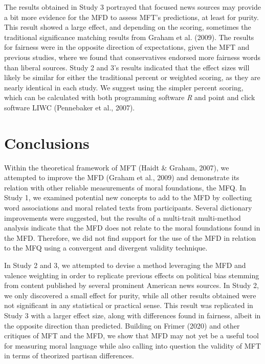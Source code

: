 \documentclass[
  man,floatsintext]{apa6}
\begin{document}
The results obtained in Study 3 portrayed that focused news sources may provide a bit more evidence for the MFD to assess MFT's predictions, at least for purity. This result showed a large effect, and depending on the scoring, sometimes the traditional significance matching results from Graham et al. (2009). The results for fairness were in the opposite direction of expectations, given the MFT and previous studies, where we found that conservatives endorsed more fairness words than liberal sources. Study 2 and 3's results indicated that the effect sizes will likely be similar for either the traditional percent or weighted scoring, as they are nearly identical in each study. We suggest using the simpler percent scoring, which can be calculated with both programming software \emph{R} and point and click software LIWC (Pennebaker et al., 2007).

\section{Conclusions}\label{conclusions}

Within the theoretical framework of MFT (Haidt \& Graham, 2007), we attempted to improve the MFD (Graham et al., 2009) and demonstrate its relation with other reliable measurements of moral foundations, the MFQ. In Study 1, we examined potential new concepts to add to the MFD by collecting word associations and moral related texts from participants. Several dictionary improvements were suggested, but the results of a multi-trait multi-method analysis indicate that the MFD does not relate to the moral foundations found in the MFD. Therefore, we did not find support for the use of the MFD in relation to the MFQ using a convergent and divergent validity technique.

In Study 2 and 3, we attempted to
devise a method leveraging the MFD and valence weighting in order to replicate previous effects on political bias stemming from content published by several prominent American news sources. In Study 2, we only discovered a small effect for purity, while all other results obtained were not
significant in any statistical or practical sense. This result was replicated in Study 3 with a larger effect size, along with differences found in fairness, albeit in the opposite direction than predicted. Building on Frimer (2020) and other critiques of MFT and the MFD, we show that MFD may not yet be a useful tool for measuring moral language while also calling into question the validity of MFT in terms of theorized partisan differences.
\end{document}

